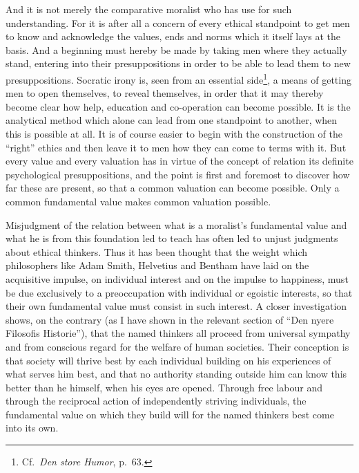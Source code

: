 \documentclass[12pt]{article}
\newcommand{\opage}[1]{\marginnote{\footnotesize\textit{[#1]}}}
\begin{document}
And it is not merely the comparative moralist who has use for such
understanding. For it is after all a concern of every ethical standpoint to
get men to know and acknowledge the values, ends and norms which it itself
lays at the basis. And a beginning must hereby be made by taking men where
they actually stand, entering into their presuppositions in order to be able
to lead them to new presuppositions. Socratic irony is, seen from an
essential side\footnote{Cf.\ \textit{Den store Humor}, p.~63.}, a means of
getting men to open themselves, to reveal themselves, in order that it may
thereby become clear how help, education and co-operation can become
possible. It is the analytical method which alone can lead from one
standpoint to another, when this is possible at all. It is of course easier
to begin with the construction of the ``right'' ethics and then leave it to
men how they can come to terms with it. But every value and every valuation
has in virtue of the concept of relation its definite psychological
presuppositions, and the point is first and foremost to discover how far
these are present, so that a common valuation can become possible. Only a
common fundamental value makes common valuation possible.

Misjudgment of the relation between what is a moralist's fundamental value
and what he is from this foundation led to teach has often led to unjust
judgments about ethical \opage{86}thinkers. Thus it has been thought that the weight
which philosophers like Adam Smith, Helvetius and Bentham have laid on the
acquisitive impulse, on individual interest and on the impulse to happiness,
must be due exclusively to a preoccupation with individual or egoistic
interests, so that their own fundamental value must consist in such
interest. A closer investigation shows, on the contrary (as I have shown in
the relevant section of ``Den nyere Filosofis Historie''), that the named
thinkers all proceed from universal sympathy and from conscious regard for
the welfare of human societies. Their conception is that society will thrive
best by each individual building on his experiences of what serves him best,
and that no authority standing outside him can know this better than he
himself, when his eyes are opened. Through free labour and through the
reciprocal action of independently striving individuals, the fundamental
value on which they build will for the named thinkers best come into its
own.
\end{document}
